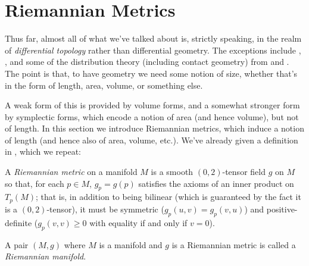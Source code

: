 
\section{Riemannian Metrics}
\label{sec:Riemannian metrics}

Thus far, almost all of what we've talked about is, strictly speaking, in the realm of \emph{differential topology} rather than differential geometry. The exceptions include , , and some of the distribution theory (including contact geometry) from  and . The point is that, to have geometry we need some notion of size, whether that's in the form of length, area, volume, or something else.

A weak form of this is provided by volume forms, and a somewhat stronger form by symplectic forms, which encode a notion of area (and hence volume), but not of length. In this section we introduce Riemannian metrics, which induce a notion of length (and hence also of area, volume, etc.). We've already given a definition in , which we repeat:

\begin{definition*}
	A \emph{Riemannian metric} on a manifold $M$ is a smooth $(0,2)$-tensor field $g$ on $M$ so that, for each $p \in M$, $g_p = g(p)$ satisfies the axioms of an inner product on $T_p(M)$; that is, in addition to being bilinear (which is guaranteed by the fact it is a $(0,2)$-tensor), it must be symmetric ($g_p(u,v) = g_p(v,u)$) and positive-definite ($g_p(v,v) \geq 0$ with equality if and only if $v=0$).
\end{definition*} 

\begin{definition}\label{def:Riemannian manifold}
	A pair $(M,g)$ where $M$ is a manifold and $g$ is a Riemannian metric is called a \emph{Riemannian manifold}.
\end{definition}


